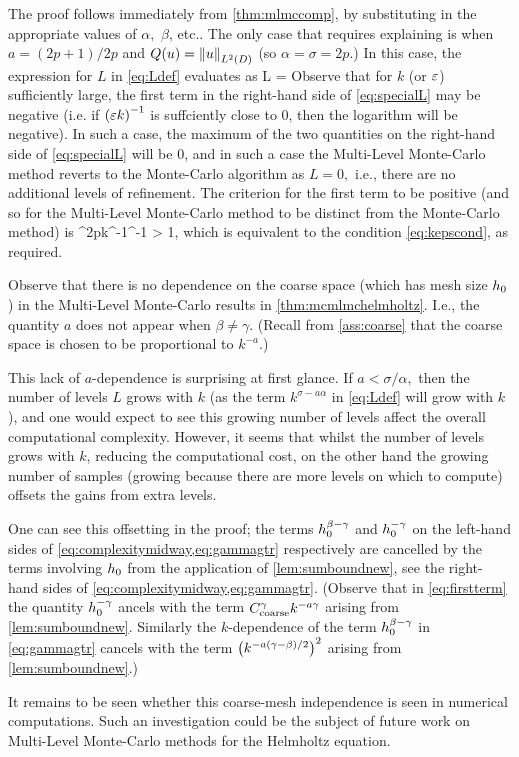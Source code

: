 \label{page:mcmlmchelmholtzproof}
The proof follows immediately from \cref{thm:mlmccomp}, by substituting in the appropriate values of $\alpha,$ $\beta$, etc.. The only case that requires explaining is when $a=(2p+1)/2p$ and $Q(u) = \NLtD{u}$ (so $\alpha = \sigma = 2p.$) In this case, the expression for $L$ in \cref{eq:Ldef} evaluates as
\beq\label{eq:specialL}
L = \max{}
\eeq
Observe that for $k$ (or $\varepsilon$) sufficiently large, the first term in the right-hand side of \cref{eq:specialL} may be negative (i.e. if $\mleft(\eps k\mright)^{-1}$ is suffciently close to 0, then the logarithm will be negative). In such a case, the maximum of the two quantities on the right-hand side of \cref{eq:specialL} will be 0, and in such a case the Multi-Level Monte-Carlo method reverts to the Monte-Carlo algorithm as $L=0,$ i.e., there are no additional levels of refinement. The criterion for the first term to be positive (and so for the Multi-Level Monte-Carlo method to be distinct from the Monte-Carlo method) is
\beqs
{}\co\Ccoarse^{2p}k^{-1}\eps^{-1} > 1,
\eeqs
which is equivalent to the condition \cref{eq:kepscond}, as required.
\epf

Observe that there is no dependence on the coarse space (which has mesh size $h_{0}$) in the Multi-Level Monte-Carlo results in \cref{thm:mcmlmchelmholtz}. I.e., the quantity $a$ does not appear when $\beta \neq \gamma$. (Recall from \cref{ass:coarse} that the coarse space is chosen to be proportional to $k^{-a}$.)

This lack of $a$-dependence is surprising at first glance. If $a < \sigma/\alpha,$ then the number of levels $L$ grows with $k$ (as the term $k^{\sigma - a\alpha}$ in \cref{eq:Ldef} will grow with $k$), and one would expect to see this growing number of levels affect the overall computational complexity. However, it seems that whilst the number of levels grows with $k$, reducing the computational cost, on the other hand the growing number of samples (growing because there are more levels on which to compute) offsets the gains from extra levels.

One can see this offsetting in the proof; the terms $h_{0}^{\beta-\gamma}$ and $h_{0}^{-\gamma}$ on the left-hand sides of  \cref{eq:complexitymidway,eq:gammagtr} respectively are cancelled by the terms involving $h_{0}$ from the application of \cref{lem:sumboundnew}, see the right-hand sides of \cref{eq:complexitymidway,eq:gammagtr}. (Observe that in \cref{eq:firstterm} the quantity $h_{0}^{-\gamma}$ ancels with the term $C_{\mathrm{coarse}}^{\gamma}k^{-a\gamma}$ arising from \cref{lem:sumboundnew}. Similarly the $k$-dependence of the term $h_{0}^{\beta-\gamma}$ in \cref{eq:gammagtr} cancels with the term $\mleft(k^{-a(\gamma-\beta)/2}\mright)^2$ arising from \ref{lem:sumboundnew}.)

It remains to be seen whether this coarse-mesh independence is seen in numerical computations. Such an investigation could be the subject of future work on Multi-Level Monte-Carlo methods for the Helmholtz equation.
\ere
{}
